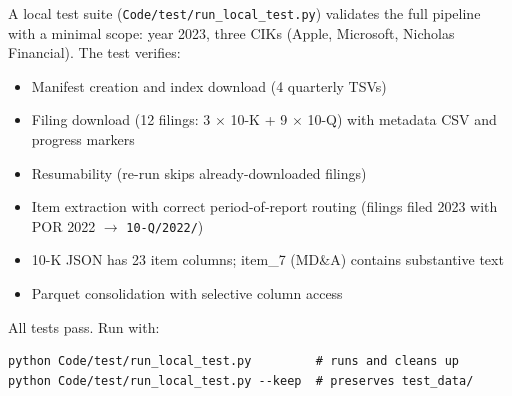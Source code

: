 \documentclass[11pt]{article}
\begin{document}
A local test suite (\texttt{Code/test/run\_local\_test.py}) validates the full pipeline with a minimal scope: year 2023, three CIKs (Apple, Microsoft, Nicholas Financial). The test verifies:

\begin{itemize}
  \item Manifest creation and index download (4 quarterly TSVs)
  \item Filing download (12 filings: 3 $\times$ 10-K + 9 $\times$ 10-Q) with metadata CSV and progress markers
  \item Resumability (re-run skips already-downloaded filings)
  \item Item extraction with correct period-of-report routing (filings filed 2023 with POR 2022 $\to$ \texttt{10-Q/2022/})
  \item 10-K JSON has 23 item columns; item\_7 (MD\&A) contains substantive text
  \item Parquet consolidation with selective column access
\end{itemize}

All tests pass. Run with:

\begin{lstlisting}[style=bash]
python Code/test/run_local_test.py         # runs and cleans up
python Code/test/run_local_test.py --keep  # preserves test_data/
\end{lstlisting}
\end{document}
